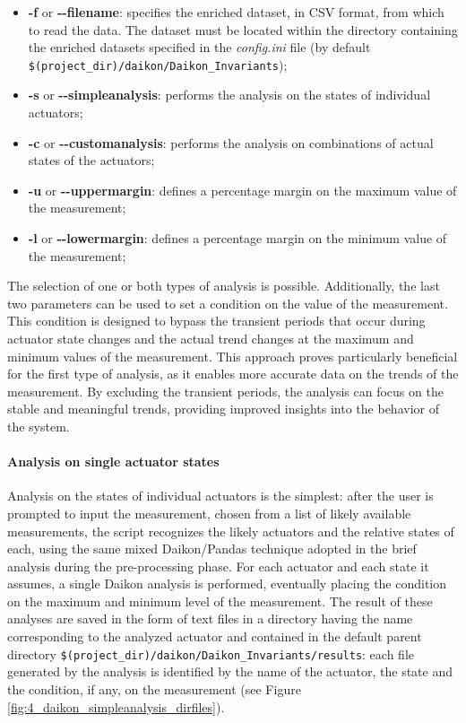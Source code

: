 \begin{itemize}
	\item \textbf{-f} or \textbf{{-}{-}filename}: specifies the enriched dataset, in CSV format, from which to read the data. The dataset must be located within the directory containing the enriched datasets specified in the \textit{config.ini} file (by default \texttt{\$(project\_dir)/daikon/Daikon\_Invariants});
	
	\item \textbf{-s} or \textbf{{-}{-}simpleanalysis}: performs the analysis on the states of individual actuators;
	
	\item \textbf{-c} or \textbf{{-}{-}customanalysis}: performs the analysis on combinations of actual states of the actuators;
	
	\item \textbf{-u} or \textbf{{-}{-}uppermargin}: defines a percentage margin on the maximum value of the measurement;
	
	\item \textbf{-l} or \textbf{{-}{-}lowermargin}: defines a percentage margin on the minimum value of the measurement;
\end{itemize}
The selection of one or both types of analysis is possible. Additionally, the last two parameters can be used to set a condition on the value of the measurement. This condition is designed to bypass the transient periods that occur during actuator state changes and the actual trend changes at the maximum and minimum values of the measurement.\newline
This approach proves particularly beneficial for the first type of analysis, as it enables more accurate data on the trends of the measurement. By excluding the transient periods, the analysis can focus on the stable and meaningful trends, providing improved insights into the behavior of the system.

\paragraph{Analysis on single actuator states}
\label{par:4_single_actuator_states_analysis}
Analysis on the states of individual actuators is the simplest: after the user is prompted to input the measurement, chosen from a list of likely available measurements, the script recognizes the likely actuators and the relative states of each, using the same mixed Daikon/Pandas technique adopted in the brief analysis during the pre-processing phase.\newline
For each actuator and each state it assumes, a single Daikon analysis is performed, eventually placing the condition on the maximum and minimum level of the measurement.\newline 
The result of these analyses are saved in the form of text files in a directory having the name corresponding to the analyzed actuator and contained in the default parent directory \texttt{\$(project\_dir)/daikon/Daikon\_Invariants/results}: each file generated by the analysis is identified by the name of the actuator, the state and the condition, if any, on the measurement (see Figure \ref{fig:4_daikon_simpleanalysis_dirfiles}).

